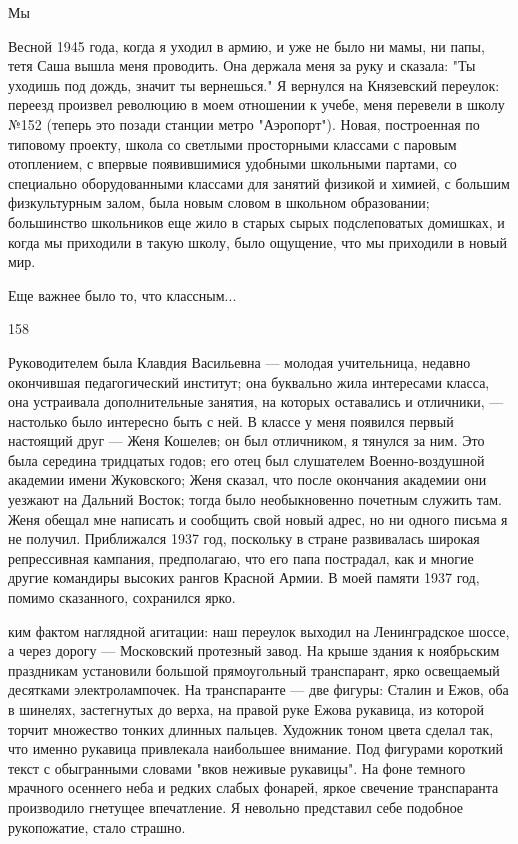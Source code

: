 Мы

Весной 1945 года, когда я уходил в армию, и уже не было ни мамы, ни папы, тетя Саша вышла меня проводить. Она держала меня за руку и сказала: "Ты уходишь под дождь, значит ты вернешься." Я вернулся на Князевский переулок: переезд произвел революцию в моем отношении к учебе, меня перевели в школу №152 (теперь это позади станции метро "Аэропорт"). Новая, построенная по типовому проекту, школа со светлыми просторными классами с паровым отоплением, с впервые появившимися удобными школьными партами, со специально оборудованными классами для занятий физикой и химией, с большим физкультурным залом, была новым словом в школьном образовании; большинство школьников еще жило в старых сырых подслеповатых домишках, и когда мы приходили в такую школу, было ощущение, что мы приходили в новый мир.

Еще важнее было то, что классным...

158

Руководителем была Клавдия Васильевна — молодая учительница, недавно окончившая педагогический институт; она буквально жила интересами класса, она устраивала дополнительные занятия, на которых оставались и отличники, — настолько было интересно быть с ней. В классе у меня появился первый настоящий друг — Женя Кошелев; он был отличником, я тянулся за ним. Это была середина тридцатых годов; его отец был слушателем Военно-воздушной академии имени Жуковского; Женя сказал, что после окончания академии они уезжают на Дальний Восток; тогда было необыкновенно почетным служить там. Женя обещал мне написать и сообщить свой новый адрес, но ни одного письма я не получил. Приближался 1937 год, поскольку в стране развивалась широкая репрессивная кампания, предполагаю, что его папа пострадал, как и многие другие командиры высоких рангов Красной Армии. В моей памяти 1937 год, помимо сказанного, сохранился ярко.

ким фактом наглядной агитации: наш переулок выходил на Ленинградское шоссе, а через дорогу — Московский протезный завод. На крыше здания к ноябрьским праздникам установили большой прямоугольный транспарант, ярко освещаемый десятками электролампочек. На транспаранте — две фигуры: Сталин и Ежов, оба в шинелях, застегнутых до верха, на правой руке Ежова рукавица, из которой торчит множество тонких длинных пальцев. Художник тоном цвета сделал так, что именно рукавица привлекала наибольшее внимание. Под фигурами короткий текст с обыгранными словами "вков неживые рукавицы". На фоне темного мрачного осеннего неба и редких слабых фонарей, яркое свечение транспаранта производило гнетущее впечатление. Я невольно представил себе подобное рукопожатие, стало страшно.

